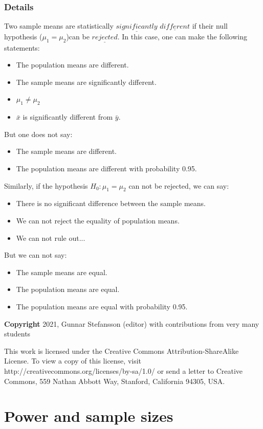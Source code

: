 \documentclass[12pt,a4paper]{article}
\theoremstyle{regla}
\theoremstyle{remark}
\theoremstyle{definition}
\theoremstyle{nonumberbreak}
\begin{document}
\subsubsection{Details}
Two sample means are statistically $\underline{significantly}$ $\underline{different}$ if their null hypothesis ($\mu_1 = \mu_2$)can be $\underline{rejected}$. In this case, one can make the following statements:
\begin{itemize}
\item
The population means are different.
\item
The sample means are significantly different.
\item
$\mu_1 \ne \mu_2$
\item
$\bar{x}$ is significantly different from $\bar{y}$.
\end{itemize}
But one does not say:
\begin{itemize}
\item
The sample means are different.
\item
The population means are different with probability 0.95.
\end{itemize}
Similarly, if the hypothesis $H_0: \mu_1 = \mu_2$ can not be rejected, we can say:
\begin{itemize}
\item
There is no significant difference between the sample means.
\item
We can not reject the equality of population means.
\item
We can not rule out...
\end{itemize}
But we can not say:
\begin{itemize}
\item
The sample means are equal.
\item
The population means are equal.
\item
The population means are equal with probability 0.95.
\end{itemize}

{\bf Copyright}
2021, Gunnar Stefansson (editor) with contributions from very many students

This work is licensed under the Creative Commons
Attribution-ShareAlike License. To view a copy of this license, visit
http://creativecommons.org/licenses/by-sa/1.0/ or send a letter to
Creative Commons, 559 Nathan Abbott Way, Stanford, California 94305,
USA.
\clearpage
\section{Power and sample sizes}
\end{document}
